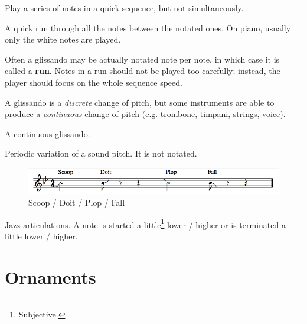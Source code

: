 \begin{definition}[Arpeggio]
    Play a series of notes in a quick sequence, but not simultaneously.
\end{definition}

\begin{definition}[Glissando]
    A quick run through all the notes between the notated ones. On piano, usually only the white notes are played.
\end{definition}

Often a glissando may be actually notated note per note, in which case it is called a \textbf{run}. Notes in a run should not be played too carefully; instead, the player should focus on the whole sequence speed.

A glissando is a \emph{discrete} change of pitch, but some instruments are able to produce a \emph{continuous} change of pitch (e.g. trombone, timpani, strings, voice).

\begin{definition}[Portamento]
    A continuous glissando.
\end{definition}

\begin{definition}[Vibrato]
    Periodic variation of a sound pitch. It is not notated.
\end{definition}

\begin{figure}[h]
    \begin{center}
        \includegraphics[width=1\textwidth]{img/fall}
        \caption{Scoop / Doit / Plop / Fall}
    \end{center}
\end{figure}

\begin{definition}
    Jazz articulations. A note is started a little\footnote{Subjective.} lower / higher or is terminated a little lower / higher.
\end{definition}

\section{Ornaments}

